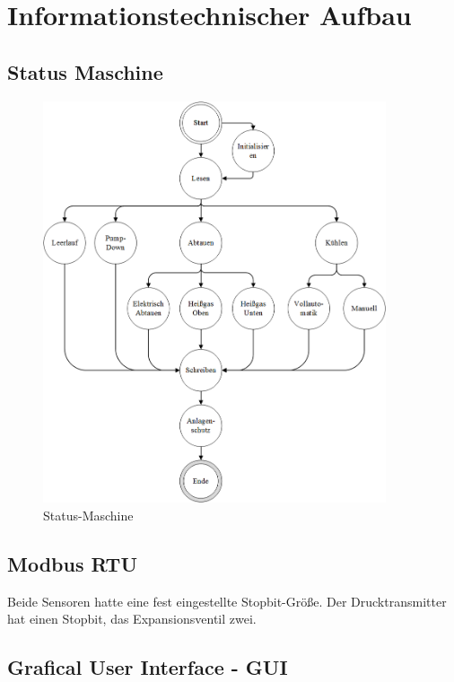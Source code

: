 \section{Informationstechnischer Aufbau}
\label{sec:Informationstechnischer Aufbau}




\subsection{Status Maschine}
\label{subsec:Status Maschine}

\begin{figure}[htb]
\centering		\includegraphics[width=0.90\textwidth]{Pictures/SM.png}
\caption{Status-Maschine}
\label{fig:SM}
\end{figure}

\subsection{Modbus RTU}
\label{subsec:Modbus RTU}

Beide Sensoren hatte eine fest eingestellte Stopbit-Größe. Der Drucktransmitter hat einen Stopbit, das Expansionsventil zwei.

\subsection{Grafical User Interface - GUI}
\label{subsec:GUI}


